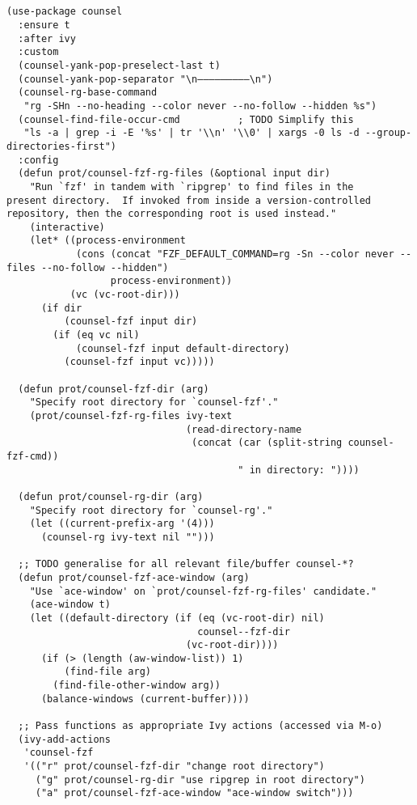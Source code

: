 \documentclass[12pt]{article}
\begin{document}
\begin{verbatim}


(use-package counsel
  :ensure t
  :after ivy
  :custom
  (counsel-yank-pop-preselect-last t)
  (counsel-yank-pop-separator "\n—————————\n")
  (counsel-rg-base-command
   "rg -SHn --no-heading --color never --no-follow --hidden %s")
  (counsel-find-file-occur-cmd          ; TODO Simplify this
   "ls -a | grep -i -E '%s' | tr '\\n' '\\0' | xargs -0 ls -d --group-directories-first")
  :config
  (defun prot/counsel-fzf-rg-files (&optional input dir)
    "Run `fzf' in tandem with `ripgrep' to find files in the
present directory.  If invoked from inside a version-controlled
repository, then the corresponding root is used instead."
    (interactive)
    (let* ((process-environment
            (cons (concat "FZF_DEFAULT_COMMAND=rg -Sn --color never --files --no-follow --hidden")
                  process-environment))
           (vc (vc-root-dir)))
      (if dir
          (counsel-fzf input dir)
        (if (eq vc nil)
            (counsel-fzf input default-directory)
          (counsel-fzf input vc)))))

  (defun prot/counsel-fzf-dir (arg)
    "Specify root directory for `counsel-fzf'."
    (prot/counsel-fzf-rg-files ivy-text
                               (read-directory-name
                                (concat (car (split-string counsel-fzf-cmd))
                                        " in directory: "))))

  (defun prot/counsel-rg-dir (arg)
    "Specify root directory for `counsel-rg'."
    (let ((current-prefix-arg '(4)))
      (counsel-rg ivy-text nil "")))

  ;; TODO generalise for all relevant file/buffer counsel-*?
  (defun prot/counsel-fzf-ace-window (arg)
    "Use `ace-window' on `prot/counsel-fzf-rg-files' candidate."
    (ace-window t)
    (let ((default-directory (if (eq (vc-root-dir) nil)
                                 counsel--fzf-dir
                               (vc-root-dir))))
      (if (> (length (aw-window-list)) 1)
          (find-file arg)
        (find-file-other-window arg))
      (balance-windows (current-buffer))))

  ;; Pass functions as appropriate Ivy actions (accessed via M-o)
  (ivy-add-actions
   'counsel-fzf
   '(("r" prot/counsel-fzf-dir "change root directory")
     ("g" prot/counsel-rg-dir "use ripgrep in root directory")
     ("a" prot/counsel-fzf-ace-window "ace-window switch")))


\end{verbatim}
\end{document}
